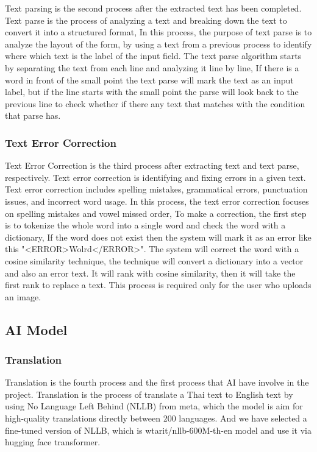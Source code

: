\documentclass[12pt,oneside,openright,a4paper]{cpe-english-project}
\begin{document}
Text parsing is the second process after the extracted text has been completed. Text parse is the process of analyzing a text and breaking down the text to convert it into a structured format, In this process, the purpose of text parse is to analyze the layout of the form, by using a text from a previous process to identify where which text is the label of the input field. The text parse algorithm starts by separating the text from each line and analyzing it line by line, If there is a word in front of the small point the text parse will mark the text as an input label, but if the line starts with the small point the parse will look back to the previous line to check whether if there any text that matches with the condition that parse has.

\subsubsection{Text Error Correction}

Text Error Correction is the third process after extracting text and text parse, respectively. Text error correction is identifying and fixing errors in a given text. Text error correction includes spelling mistakes, grammatical errors, punctuation issues, and incorrect word usage. In this process, the text error correction focuses on spelling mistakes and vowel missed order, To make a correction, the first step is to tokenize the whole word into a single word and check the word with a dictionary, If the word does not exist then the system will mark it as an error like this "<ERROR>Wolrd</ERROR>". The system will correct the word with a cosine similarity technique, the technique will convert a dictionary into a vector and also an error text. It will rank with cosine similarity, then it will take the first rank to replace a text. This process is required only for the user who uploads an image.

\subsection{AI Model}

\subsubsection{Translation}

Translation is the fourth process and the first process that AI have involve in the project. Translation is the process of  translate a Thai text to English text by using No Language Left Behind (NLLB) from meta, which the model is aim for high-quality translations directly between 200 languages. And we have selected a fine-tuned version of NLLB, which is wtarit/nllb-600M-th-en model and use it via hugging face transformer.
\end{document}
